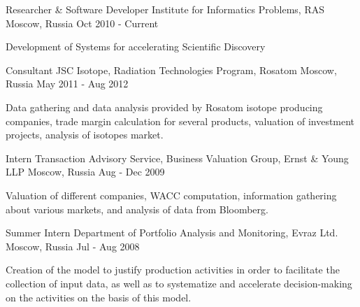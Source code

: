 \begin{cventries}
\cventry
    {Researcher \& Software Developer}
    {Institute for Informatics Problems, RAS}
    {Moscow, Russia}
    {Oct 2010 - Current}
    {
      \begin{cvitems}
       \item {Development of Systems for accelerating Scientific Discovery}
      \end{cvitems}
    }
  \cventry
    {Consultant}
    {JSC Isotope, Radiation Technologies Program, Rosatom}
    {Moscow, Russia}
    {May 2011 - Aug 2012}
    {
      \begin{cvitems}
        \item {Data gathering and data analysis provided by Rosatom isotope producing companies, trade margin calculation for several products, valuation of investment projects, analysis of isotopes market.}
      \end{cvitems}
    }
 
 \cventry
    {Intern}
    {Transaction Advisory Service, Business Valuation Group, Ernst \& Young LLP}
    {Moscow, Russia}
    {Aug - Dec 2009}
    {
      \begin{cvitems}
        \item {Valuation of different companies, WACC computation, information gathering about various markets, and analysis of data from Bloomberg.}
      \end{cvitems}
    }
     \cventry
    {Summer Intern}
    {Department of Portfolio Analysis and Monitoring, Evraz Ltd.}
    {Moscow, Russia}
    {Jul - Aug 2008}
    {
      \begin{cvitems}
        \item {Creation of the model to justify production activities in order to facilitate the collection of input data, as well as to systematize and accelerate decision-making on the activities on the basis of this model.}
      \end{cvitems}
    }


\end{cventries}
